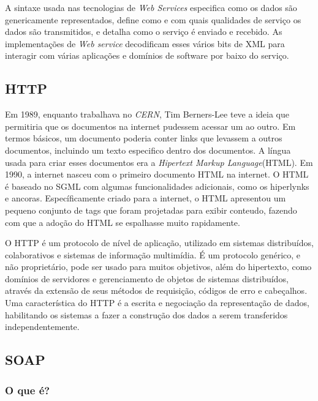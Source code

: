\documentclass{acm_proc_article-sp}
\begin{document}
		A sintaxe usada nas tecnologias de \emph{Web Services} especifica como os dados são genericamente representados, define como e com quais qualidades de serviço os dados são transmitidos, e detalha como o serviço é enviado e recebido. As implementações de \emph{Web service} decodificam esses vários bits de XML para interagir com várias aplicações e domínios de software por baixo do serviço.\cite{UNDERWEBSERVICES}
		
		
	\subsection{HTTP}
		Em 1989, enquanto trabalhava no \emph{CERN}, Tim Berners-Lee teve a ideia que permitiria que os documentos na 
		internet pudessem acessar um ao outro. Em termos básicos, um documento poderia conter links que
		levassem a outros documentos, incluindo um texto especifico dentro dos documentos. A língua usada
		para criar esses documentos era a \emph{Hipertext Markup Language}(HTML). Em 1990, a internet nasceu com
		o primeiro documento HTML na internet. O HTML é baseado no SGML com algumas funcionalidades adicionais, como os hiperlynks
		e ancoras. Específicamente criado para a internet, o HTML apresentou um pequeno conjunto de tags que foram projetadas
		para exibir conteudo, fazendo com que a adoção do HTML se espalhasse muito rapidamente.\cite{PRO_PHPXML}
	
		O HTTP é um protocolo de nível de aplicação, utilizado em sistemas distribuídos, colaborativos e sistemas de informação multimídia. É um protocolo genérico, e não proprietário, pode ser usado para muitos objetivos, além do hipertexto, como domínios de servidores e gerenciamento de objetos de sistemas distribuídos, através da extensão de seus métodos de requisição, códigos de erro e cabeçalhos. Uma característica do HTTP é a escrita e negociação da representação de dados, habilitando os sistemas a fazer a construção dos dados a serem transferidos independentemente.\cite{HTTP-1.1}
	

		
		
		
	\subsection{SOAP}
	
		\subsubsection{O que é?}
	
\end{document}

